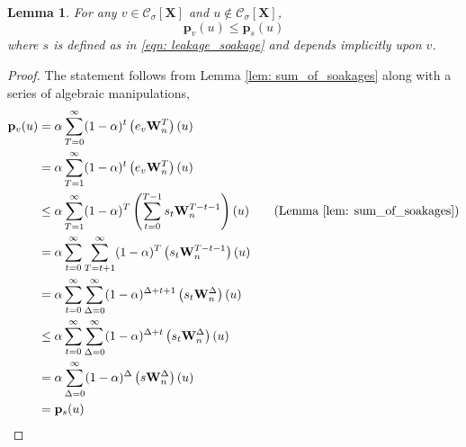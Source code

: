 \documentclass{article}
\newcommand{\1}{\mathbf{1}}
\newcommand{\pbf}{\mathbf{p}}
\newcommand{\Xbf}{\mathbf{X}}
\newcommand{\Wbf}{\mathbf{W}}
\newcommand{\Cset}{\mathcal{C}}
\newcommand{\Csig}{\Cset_{\sigma}}
\theoremstyle{aldenthm}
\newtheorem{lemma}{Lemma}
\begin{document}
\begin{lemma}
	\label{lem: soakage_ppr_lb}
	For any $v \in \Csig[\Xbf]$ and $u \not\in \Csig[\Xbf]$,
	\begin{equation*}
	\pbf_{v}(u) \leq \pbf_{s}(u)
	\end{equation*}
	where $s$ is defined as in \eqref{eqn: leakage_soakage} and depends implicitly upon $v$.
\end{lemma}
\begin{proof}
	The statement follows from Lemma \ref{lem: sum_of_soakages} along with a series of algebraic manipulations,
	\begin{align*}
	\pbf_v(u) & = \alpha\sum_{T = 0}^{\infty} (1 - \alpha)^t \left(e_v \Wbf_n^T\right)(u) \\
	& = \alpha\sum_{T = 1}^{\infty} (1 - \alpha)^t \left(e_v \Wbf_n^T\right)(u) \\
	& \leq \alpha \sum_{T=1}^{\infty} (1 - \alpha)^T \left( \sum_{t = 0}^{T - 1} s_t \Wbf_n^{T - t - 1} \right)(u) \tag{Lemma \ref{lem: sum_of_soakages}}\\
	& = \alpha \sum_{t=0}^{\infty} \sum_{T = t + 1}^{\infty} (1 - \alpha)^T \left( s_t \Wbf_n^{T - t - 1} \right)(u)\\
	& = \alpha \sum_{t=0}^{\infty} \sum_{\Delta = 0}^{\infty} (1 - \alpha)^{\Delta + t + 1} \left( s_t \Wbf_n^{\Delta} \right)(u) \\
	& \leq \alpha \sum_{t=0}^{\infty} \sum_{\Delta = 0}^{\infty} (1 - \alpha)^{\Delta + t } \left( s_t \Wbf_n^{\Delta} \right)(u) \\
	& = \alpha \sum_{\Delta = 0}^{\infty} (1 - \alpha)^{\Delta} \left(s \Wbf_n^{\Delta}\right)(u) \\
	& = \pbf_s(u)
	\end{align*}
\end{proof}
\end{document}
